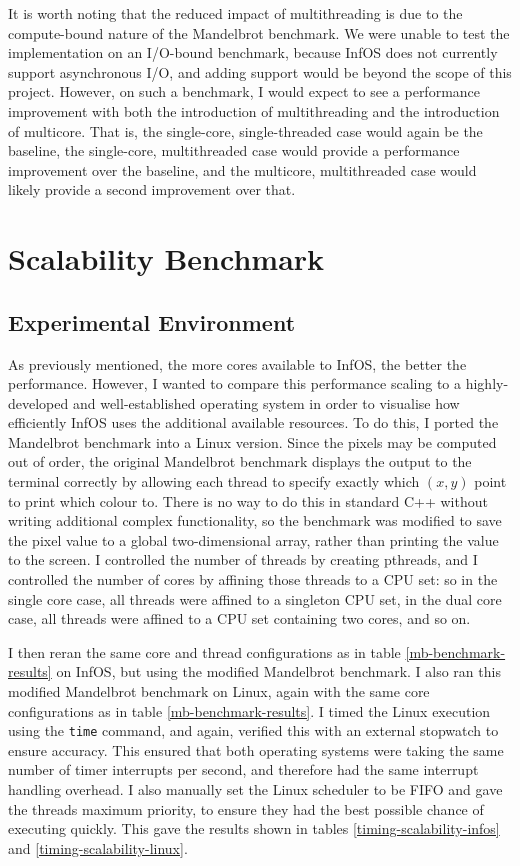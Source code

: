 \documentclass[bsc,frontabs,singlespacing,parskip,deptreport]{infthesis}
\begin{document}
It is worth noting that the reduced impact of multithreading is due to the compute-bound nature of the Mandelbrot benchmark. We were unable to test the implementation on an I/O-bound benchmark, because InfOS does not currently support asynchronous I/O, and adding support would be beyond the scope of this project. However, on such a benchmark, I would expect to see a performance improvement with both the introduction of multithreading and the introduction of multicore. That is, the single-core, single-threaded case would again be the baseline, the single-core, multithreaded case would provide a performance improvement over the baseline, and the multicore, multithreaded case would likely provide a second improvement over that.

\section{Scalability Benchmark}
\label{mb-mod-benchmark}
\subsection{Experimental Environment} 
As previously mentioned, the more cores available to InfOS, the better the performance. However, I wanted to compare this performance scaling to a highly-developed and well-established operating system in order to visualise how efficiently InfOS uses the additional available resources. To do this, I ported the Mandelbrot benchmark into a Linux version. Since the pixels may be computed out of order, the original Mandelbrot benchmark displays the output to the terminal correctly by allowing each thread to specify exactly which $(x,y)$ point to print which colour to. There is no way to do this in standard C++ without writing additional complex functionality, so the benchmark was modified to save the pixel value to a global two-dimensional array, rather than printing the value to the screen. I controlled the number of threads by creating pthreads, and I controlled the number of cores by affining those threads to a CPU set: so in the single core case, all threads were affined to a singleton CPU set, in the dual core case, all threads were affined to a CPU set containing two cores, and so on.


I then reran the same core and thread configurations as in table \ref{mb-benchmark-results} on InfOS, but using the modified Mandelbrot benchmark. I also ran this modified Mandelbrot benchmark on Linux, again with the same core configurations as in table \ref{mb-benchmark-results}. I timed the Linux execution using the \verb|time| command, and again, verified this with an external stopwatch to ensure accuracy. This ensured that both operating systems were taking the same number of timer interrupts per second, and therefore had the same interrupt handling overhead. I also manually set the Linux scheduler to be FIFO and gave the threads maximum priority, to ensure they had the best possible chance of executing quickly. This gave the results shown in tables \ref{timing-scalability-infos} and \ref{timing-scalability-linux}.
\end{document}
